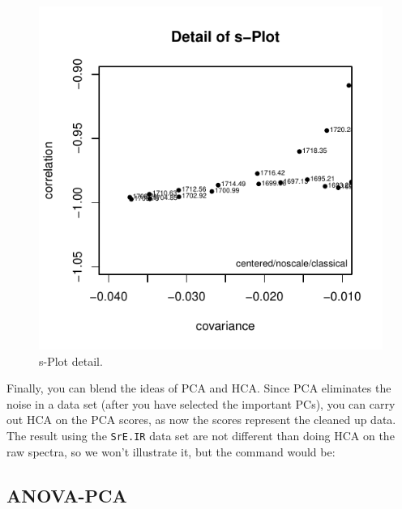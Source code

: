 \documentclass[letter,10pt,twocolumn,twoside,printwatermark=false]{pinp}
\begin{document}
\begin{figure}

{\centering \includegraphics{ChemoSpec2_files/figure-latex/Chunk30b-1} 

}

\caption{\label{splot2}s-Plot detail.}\label{fig:Chunk30b}
\end{figure}

Finally, you can blend the ideas of PCA and HCA. Since PCA eliminates
the noise in a data set (after you have selected the important PCs), you
can carry out HCA on the PCA scores, as now the scores represent the
cleaned up data. The result using the \texttt{SrE.IR} data set are not
different than doing HCA on the raw spectra, so we won't illustrate it,
but the command would be:

\begin{Shaded}
\begin{Highlighting}[]
   \NormalTok{(}\OperatorTok{:}\NormalTok{),}
\end{Highlighting}
\end{Shaded}

\hypertarget{anova-pca}{%
\subsection{ANOVA-PCA}\label{anova-pca}}
\end{document}
